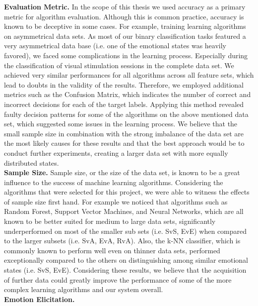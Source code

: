 \textbf{Evaluation Metric.}
In the scope of this thesis we used accuracy as a primary metric for algorithm evaluation. Although this is common practice, accuracy is known to be deceptive in some cases. For example, training learning algorithms on asymmetrical data sets. As most of our binary classification tasks featured a very asymmetrical data base (i.e. one of the emotional states was heavily favored), we faced some complications in the learning process. Especially during the classification of visual stimulation sessions in the complete data set. We achieved very similar performances for all algorithms across all feature sets, which lead to doubts in the validity of the results. Therefore, we employed additional metrics such as the Confusion Matrix, which indicates the number of correct and incorrect decisions for each of the target labels. Applying this method revealed faulty decision patterns for some of the algorithms on the above mentioned data set, which suggested some issues in the learning process. We believe that the small sample size in combination with the strong imbalance of the data set are the most likely causes for these results and that the best approach would be to conduct further experiments, creating a larger data set with more equally distributed states. \\[10pt] 
\textbf{Sample Size.}
Sample size, or the size of the data set, is known to be a great influence to the success of machine learning algorithms. Considering the algorithms that were selected for this project, we were able to witness the effects of sample size first hand. For example we noticed that algorithms such as Random Forest, Support Vector Machines, and Neural Networks, which are all known to be better suited for medium to large data sets, significantly underperformed on most of the smaller sub sets (i.e. SvS, EvE) when compared to the larger subsets (i.e. SvA, EvA, RvA). Also, the k-NN classifier, which is commonly known to perform well even on thinner data sets, performed exceptionally compared to the others on distinguishing among similar emotional states (i.e. SvS, EvE). Considering these results, we believe that the acquisition of further data could greatly improve the performance of some of the more complex learning algorithms and our system overall.\\[10pt]
\textbf{Emotion Elicitation.}
